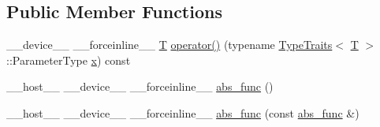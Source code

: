 \subsection*{Public Member Functions}
\begin{DoxyCompactItemize}
\item 
\-\_\-\-\_\-device\-\_\-\-\_\- \-\_\-\-\_\-forceinline\-\_\-\-\_\- \hyperlink{calib3d_8hpp_a3efb9551a871ddd0463079a808916717}{T} \hyperlink{structcv_1_1gpu_1_1device_1_1abs__func_a3629857fc87840e8275ae535faa41560}{operator()} (typename \hyperlink{structcv_1_1gpu_1_1device_1_1TypeTraits}{Type\-Traits}$<$ \hyperlink{calib3d_8hpp_a3efb9551a871ddd0463079a808916717}{T} $>$\-::Parameter\-Type \hyperlink{highgui__c_8h_a6150e0515f7202e2fb518f7206ed97dc}{x}) const 
\item 
\-\_\-\-\_\-host\-\_\-\-\_\- \-\_\-\-\_\-device\-\_\-\-\_\- \-\_\-\-\_\-forceinline\-\_\-\-\_\- \hyperlink{structcv_1_1gpu_1_1device_1_1abs__func_abbf4ff06d8b5fabdef77264f28674379}{abs\-\_\-func} ()
\item 
\-\_\-\-\_\-host\-\_\-\-\_\- \-\_\-\-\_\-device\-\_\-\-\_\- \-\_\-\-\_\-forceinline\-\_\-\-\_\- \hyperlink{structcv_1_1gpu_1_1device_1_1abs__func_a31a99eb18a9576608c230c3979d1e16a}{abs\-\_\-func} (const \hyperlink{structcv_1_1gpu_1_1device_1_1abs__func}{abs\-\_\-func} \&)
\end{DoxyCompactItemize}


